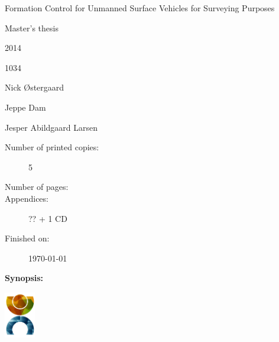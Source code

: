 \begin{minipage}[c]{0.45\textwidth}
	\begin{description}[leftmargin=\parindent+0.5em,labelindent=\parindent]
	\item [\textbf{Title:}] \tightlist
	\item Formation Control for Unmanned Surface Vehicles for Surveying Purposes
	\end{description}

	\begin{description}
	\item [\textbf{Theme:}] \tightlist
	\item Master’s thesis
	\end{description}

	\begin{description}
	\item[Projectperiod:] \tightlist
	\item 2014
	\end{description}
	\begin{description}
	\item[Projectgroup:] \tightlist
	\item 1034
	\end{description}

	\begin{description}
	\item[Participants:] \tightlist
	\item Nick \O stergaard 
	\item Jeppe Dam
	\end{description} 

	\begin{description}
	\item[Supervisor:] \tightlist
	\item Jesper Abildgaard Larsen
	\end{description}

	\begin{description}
	\item[Number of printed copies:] 5
	\item[Number of pages:] \arabic{lastsheet} 
	\item[Appendices:] ?? + 1 CD
	\item[Finished on:] \today
	\end{description}
\end{minipage}
\hfill
\begin{minipage}[r]{0.50\textwidth}
	{\textbf{Synopsis:}} \\
	\fbox{\parbox[c]{\textwidth-0.5em}{
	\bigskip
	{\vfill{\small 
	\bigskip}}
    }}
\end{minipage}
\vfill
\begin{center}
	\includegraphics[width=1.35cm]{frontmatter/ca-logo.pdf}
\end{center}
\restoregeometry

